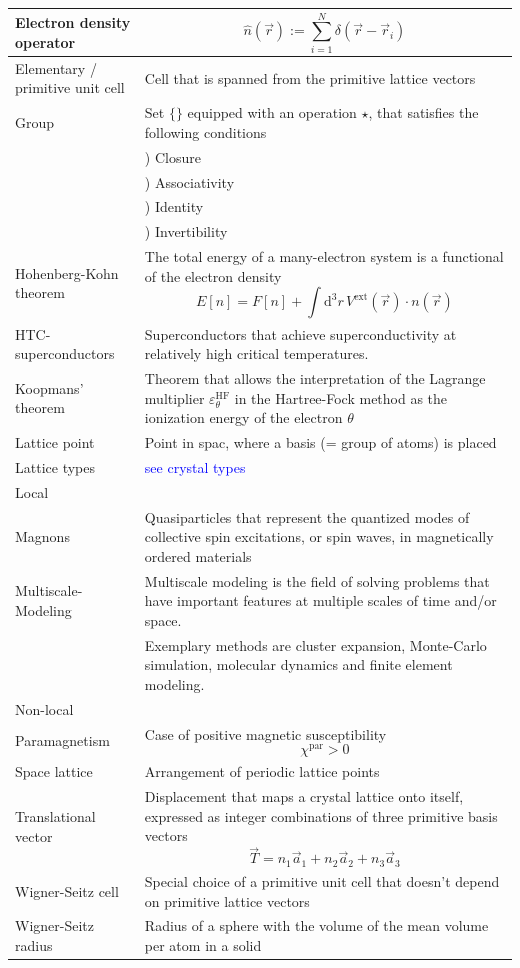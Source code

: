 \documentclass{article}
\newcommand{\diff}{\mathrm{d}}
\begin{document}
\begin{xltabular}{\linewidth}{p{6cm}|X}
	\hline
		Electron density operator & $$\hat{n}(\vec{r}) := \sum_{i=1}^N \delta(\vec{r} - \vec{r}_i)$$ \\
	\hline
		Elementary / primitive unit cell & Cell that is spanned from the primitive lattice vectors \\
	\hline
		Group & Set $\{\}$ equipped with an operation $\star$, that satisfies the following conditions \\
			& ) Closure \\
			& ) Associativity \\
			& ) Identity \\
			& ) Invertibility \\
	\hline
		Hohenberg-Kohn theorem & The total energy of a many-electron system is a functional of the electron density
			$$E[n] = F[n] + \int \diff^3r \, V^\text{ext}(\vec{r}) \cdot n(\vec{r})$$ \\
	\hline
		HTC-superconductors & Superconductors that achieve superconductivity at relatively high critical temperatures.  \\
	\hline
		Koopmans' theorem & Theorem that allows the interpretation of the Lagrange multiplier $\varepsilon_\theta^\text{HF}$ in the Hartree-Fock method as the ionization energy of the electron $\theta$  \\
	\hline
		Lattice point & Point in spac, where a basis (= group of atoms) is placed \\
	\hline
		Lattice types & \textcolor{blue}{see crystal types} \\
	\hline
		Local &  \\
	\hline
		Magnons & Quasiparticles that represent the quantized modes of collective spin excitations, or spin waves, in magnetically ordered materials \\
	\hline
		Multiscale-Modeling & Multiscale modeling is the field of solving problems that have important features at multiple scales of time and/or space.\\
		& Exemplary methods are cluster expansion, Monte-Carlo simulation, molecular dynamics and finite element modeling.\\
	\hline
		Non-local &  \\
	\hline
		Paramagnetism & Case of positive magnetic susceptibility
			$$\chi^\text{par} > 0$$ \\
	\hline
		Space lattice & Arrangement of periodic lattice points \\
	\hline
		Translational vector & Displacement that maps a crystal lattice onto itself, expressed as integer combinations of three primitive basis vectors
			$$\vec{T} = n_1\vec{a}_1 + n_2\vec{a}_2 + n_3\vec{a}_3$$ \\
	\hline
		Wigner-Seitz cell & Special choice of a primitive unit cell that doesn't depend on primitive lattice vectors \\
	\hline
		Wigner-Seitz radius & Radius of a sphere with the volume of the mean volume per atom in a solid \\
	\hline\hline
\end{xltabular}
\end{document}
